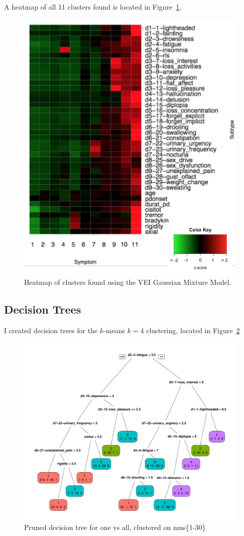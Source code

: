 \documentclass[10pt]{article}
\begin{document}
\begin{multicols}{2}
A heatmap of all 11 clusters found is located in Figure~\ref{fig:nms30m-mclust-heatmap-improved}.

\begin{figure}[p]
  \centering
  \includegraphics[width=0.7\linewidth]{nms30m-mclust-heatmap-improved.png}
  \caption{Heatmap of clusters found using the VEI Gaussian Mixture Model.}
  \label{fig:nms30m-mclust-heatmap-improved}
\end{figure}

\subsection{Decision Trees}

I created decision trees for the $k$-means $k = 4$ clustering, located in
Figure~\ref{fig:nms30m-dtree-all}

\begin{figure}[p]
  \centering
  \includegraphics[width=\linewidth]{nms30m-dtree-all.pdf}
  \caption{Pruned decision tree for one vs all, clustered on nms\{1-30\}}
  \label{fig:nms30m-dtree-all}
\end{figure}


\end{multicols}
\end{document}
